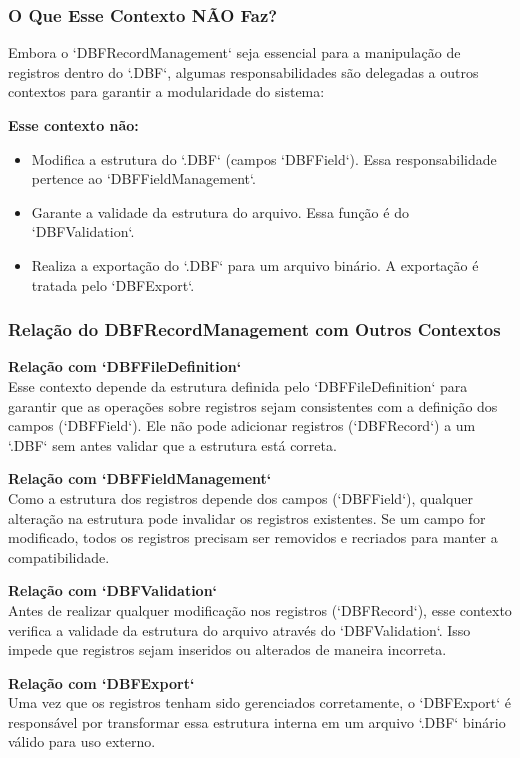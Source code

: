 \subsubsection{O Que Esse Contexto NÃO Faz?}

Embora o `DBFRecordManagement` seja essencial para a manipulação de registros dentro do `.DBF`, algumas responsabilidades são delegadas a outros contextos para garantir a modularidade do sistema:

\textbf{Esse contexto não:}
\begin{itemize}
    \item Modifica a estrutura do `.DBF` (campos `DBFField`). Essa responsabilidade pertence ao `DBFFieldManagement`.
    \item Garante a validade da estrutura do arquivo. Essa função é do `DBFValidation`.
    \item Realiza a exportação do `.DBF` para um arquivo binário. A exportação é tratada pelo `DBFExport`.
\end{itemize}

\subsubsection{Relação do DBFRecordManagement com Outros Contextos}

\textbf{Relação com `DBFFileDefinition`} \\
Esse contexto depende da estrutura definida pelo `DBFFileDefinition` para garantir que as operações sobre registros sejam consistentes com a definição dos campos (`DBFField`). Ele não pode adicionar registros (`DBFRecord`) a um `.DBF` sem antes validar que a estrutura está correta.

\textbf{Relação com `DBFFieldManagement`} \\
Como a estrutura dos registros depende dos campos (`DBFField`), qualquer alteração na estrutura pode invalidar os registros existentes. Se um campo for modificado, todos os registros precisam ser removidos e recriados para manter a compatibilidade.

\textbf{Relação com `DBFValidation`} \\
Antes de realizar qualquer modificação nos registros (`DBFRecord`), esse contexto verifica a validade da estrutura do arquivo através do `DBFValidation`. Isso impede que registros sejam inseridos ou alterados de maneira incorreta.

\textbf{Relação com `DBFExport`} \\
Uma vez que os registros tenham sido gerenciados corretamente, o `DBFExport` é responsável por transformar essa estrutura interna em um arquivo `.DBF` binário válido para uso externo.


